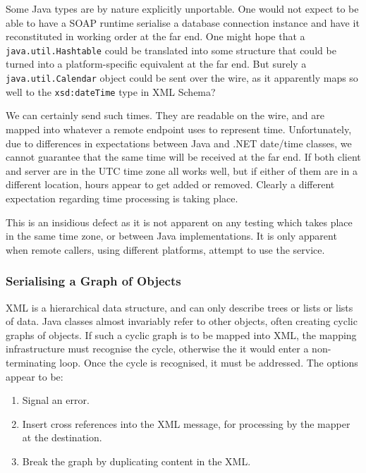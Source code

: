 Some Java types are by nature explicitly unportable. One would not
expect to be able to have a SOAP runtime serialise a database
connection instance and have it reconstituted in working order at the
far end. One might hope that a {\tt java.util.Hashtable} could be
translated into some structure that could be turned into a
platform-specific equivalent at the far end. But surely a {\tt
java.util.Calendar} object could be sent over the wire, as it
apparently maps so well to the {\tt xsd:dateTime} type in XML Schema?

We can certainly send such times. They are readable on the wire, and
are mapped into whatever a remote endpoint uses to represent
time. Unfortunately, due to differences in expectations between Java
and .NET date/time classes, we cannot guarantee that the same time
will be received at the far end. If both client and server are in the
UTC time zone all works well, but if either of them are in a different
location, hours appear to get added or removed. Clearly a different
expectation regarding time processing is taking place.

This is an insidious defect as it is not apparent on any
testing which takes place in the same time zone, or between Java
implementations. It is only apparent when remote callers, using
different platforms, attempt to use the service.


\subsubsection{Serialising a Graph of Objects}
\label{objections:o-x:graphs}

XML is a hierarchical data structure, and can only describe trees or
lists or lists of data. Java classes almost invariably refer to other
objects, often creating cyclic graphs of objects. If such a cyclic
graph is to be mapped into XML, the mapping infrastructure must
recognise the cycle, otherwise the it would enter a non-terminating
loop. Once the cycle is recognised, it must be addressed. The options
appear to be:
\begin{enumerate}
\item Signal an error.
\item Insert cross references into the XML message, for processing by
the mapper at the destination. 
\item Break the graph by duplicating content in the XML.
\end{enumerate}

